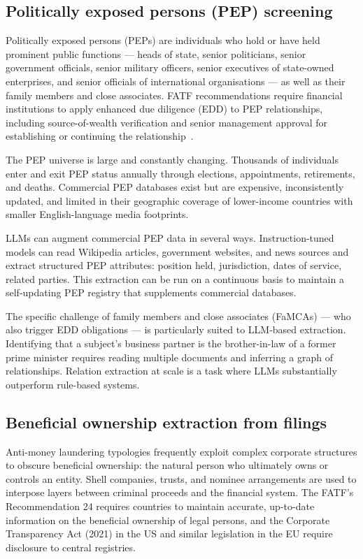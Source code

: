 \subsection{Politically exposed persons (PEP) screening}
\label{sec:ch11-pep-screening}

Politically exposed persons (PEPs) are individuals who hold or have held prominent public functions --- heads of state, senior politicians, senior government officials, senior military officers, senior executives of state-owned enterprises, and senior officials of international organisations --- as well as their family members and close associates. FATF recommendations require financial institutions to apply enhanced due diligence (EDD) to PEP relationships, including source-of-wealth verification and senior management approval for establishing or continuing the relationship~\cite{fatf2021aml}.

The PEP universe is large and constantly changing. Thousands of individuals enter and exit PEP status annually through elections, appointments, retirements, and deaths. Commercial PEP databases exist but are expensive, inconsistently updated, and limited in their geographic coverage of lower-income countries with smaller English-language media footprints.

LLMs can augment commercial PEP data in several ways. Instruction-tuned models can read Wikipedia articles, government websites, and news sources and extract structured PEP attributes: position held, jurisdiction, dates of service, related parties. This extraction can be run on a continuous basis to maintain a self-updating PEP registry that supplements commercial databases.

The specific challenge of family members and close associates (FaMCAs) --- who also trigger EDD obligations --- is particularly suited to LLM-based extraction. Identifying that a subject's business partner is the brother-in-law of a former prime minister requires reading multiple documents and inferring a graph of relationships. Relation extraction at scale is a task where LLMs substantially outperform rule-based systems.

\subsection{Beneficial ownership extraction from filings}
\label{sec:ch11-beneficial-ownership}

Anti-money laundering typologies frequently exploit complex corporate structures to obscure beneficial ownership: the natural person who ultimately owns or controls an entity. Shell companies, trusts, and nominee arrangements are used to interpose layers between criminal proceeds and the financial system. The FATF's Recommendation 24 requires countries to maintain accurate, up-to-date information on the beneficial ownership of legal persons, and the Corporate Transparency Act (2021) in the US and similar legislation in the EU require disclosure to central registries.

